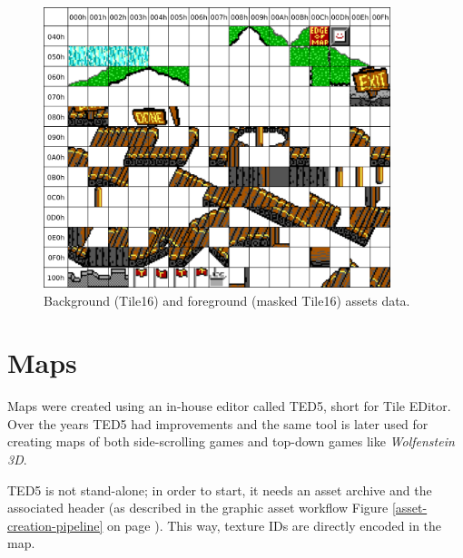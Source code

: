 \documentclass[book.tex]{subfiles}
\begin{document}
\begin{figure}[H] 
  \centering 
  \includegraphics[width=0.9\textwidth, frame]{screenshots_300dpi/tile16M_assets.png}
  \caption{Background (Tile16) and foreground (masked Tile16) assets data.}
  \label{fig:tile16_assets}
\end{figure} 



\section{Maps}
Maps were created using an in-house editor called TED5, short for Tile EDitor. Over the years TED5 had improvements and the same tool is later used for creating maps of both side-scrolling games and top-down games like \textit{Wolfenstein 3D}.\\
\par
 TED5 is not stand-alone; in order to start, it needs an asset archive and the  associated header (as described in the graphic asset workflow Figure \ref{asset-creation-pipeline} on page \pageref{asset-creation-pipeline}). This way, texture IDs are directly encoded in the map.\\

 
 \par
 \\
 \par
{}\\
 
\end{document}
